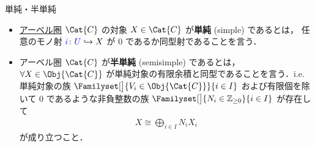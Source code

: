 \documentclass[TQFT_main]{subfiles}
\begin{document}
    \begin{mydef}[label=def:semisimple-cat]{単純・半単純}
        \begin{itemize}
            \item \hyperref[def:additive-cat]{アーベル圏} $\Cat{C}$ の対象 $X \in \Cat{C}$ が\textbf{単純} (simple) であるとは，
            任意のモノ射 $\textcolor{blue}{i} \colon \textcolor{blue}{U} \hookrightarrow X$ が $0$ であるか同型射であることを言う．
            \item アーベル圏 $\Cat{C}$ が\textbf{半単純} (semisimple) であるとは，$\forall X \in \Obj{\Cat{C}}$ が単純対象の有限余積と同型であることを言う．i.e.
            単純対象の族 $\Familyset[\big]{V_i \in \Obj{\Cat{C}}}{i \in I}$ および有限個を除いて $0$ であるような非負整数の族 $\Familyset[\big]{N_i \in \mathbb{Z}_{\ge 0}}{i \in I}$ が存在して
            \begin{align}
                X \cong \bigoplus_{i \in I} N_i X_i
            \end{align}
            が成り立つこと．
        \end{itemize}
    \end{mydef}
\end{document}
